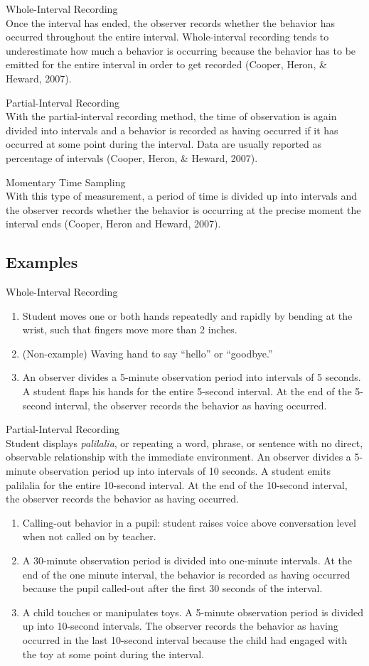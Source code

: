 Whole-Interval Recording\\
Once the interval has ended, the observer records whether the behavior has occurred throughout the entire interval. Whole-interval recording tends to underestimate how much a behavior is occurring because the behavior has to be emitted for the entire interval in order to get recorded (Cooper, Heron, \& Heward, 2007).

Partial-Interval Recording\\
With the partial-interval recording method, the time of observation is again divided into intervals and a behavior is recorded as having occurred if it has occurred at some point during the interval. Data are usually reported as percentage of intervals (Cooper, Heron, \& Heward, 2007).

Momentary Time Sampling\\
With this type of measurement, a period of time is divided up into intervals and the observer records whether the behavior is occurring at the precise moment the interval ends (Cooper, Heron and Heward, 2007).

\subsection{Examples}
Whole-Interval Recording
\begin{enumerate}
\item Student moves one or both hands repeatedly and rapidly by bending at the wrist, such that fingers move more than 2 inches. 
\item (Non-example) Waving hand to say ``hello'' or ``goodbye.''
\item An observer divides a 5-minute observation period into intervals of 5 seconds. A student flaps his hands for the entire 5-second interval. At the end of the 5-second interval, the observer records the behavior as having occurred.
\end{enumerate}
%
Partial-Interval Recording\\
Student displays \textit{palilalia}, or repeating a word, phrase, or sentence with no direct, observable relationship with the immediate environment. An observer divides a 5-minute observation period up into intervals of 10 seconds. A student emits palilalia for the entire 10-second interval. At the end of the 10-second interval, the observer records the behavior as having occurred.
\begin{enumerate}
\item Calling-out behavior in a pupil: student raises voice above conversation level when not called on by teacher.
\item A 30-minute observation period is divided into one-minute intervals.  At the end of the one minute interval, the behavior is recorded as having occurred because the pupil called-out after the first 30 seconds of the interval.
\item A child touches or manipulates toys. A 5-minute observation period is divided up into 10-second intervals. The observer records the behavior as having occurred in the last 10-second interval because the child had engaged with the toy at some point during the interval. 
\end{enumerate}

